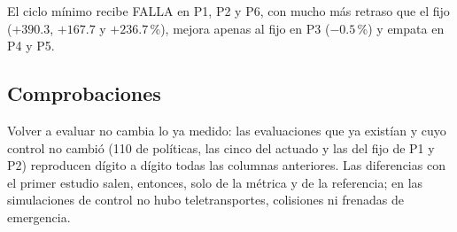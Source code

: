 
El ciclo mínimo recibe FALLA en P1, P2 y P6, con mucho más retraso que el fijo
($+390.3$, $+167.7$ y $+236.7$\,\%), mejora apenas al fijo en P3
($-0.5$\,\%) y empata en P4 y P5.


\subsection*{Comprobaciones}

Volver a evaluar no cambia lo ya medido: las evaluaciones que ya
existían y cuyo control no cambió (110 de políticas, las cinco del
actuado y las del fijo de P1 y P2) reproducen dígito a dígito todas las
columnas anteriores. Las diferencias con el primer estudio salen,
entonces, solo de la métrica y de la referencia; en las simulaciones de
control no hubo teletransportes, colisiones ni frenadas de emergencia.

